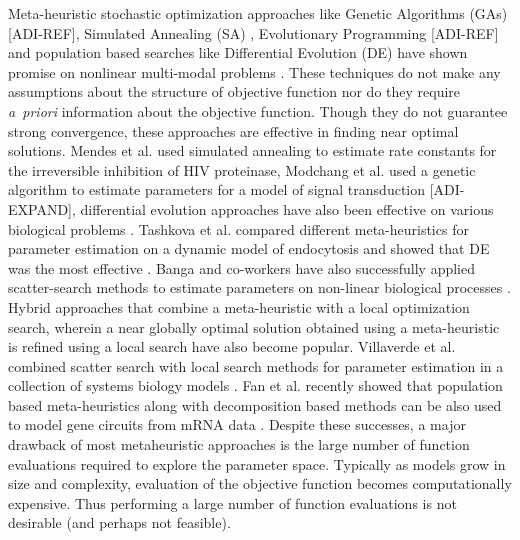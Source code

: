 \documentclass[12pt]{article}
\begin{document}
Meta-heuristic stochastic optimization approaches like Genetic Algorithms (GAs) [ADI-REF], Simulated Annealing (SA) \cite{kirkpatrick1983optimization},
Evolutionary Programming [ADI-REF] and population based searches like Differential Evolution (DE) \cite{storn1997differential} have shown promise on nonlinear multi-modal problems \cite{sun2012parameter}.
These techniques do not make any assumptions about the structure of objective function nor do they require \textit{a~priori} information about the objective function.
Though they do not guarantee strong convergence, these approaches are effective in finding near optimal solutions.
Mendes et al. \cite{mendes1998non} used simulated annealing to estimate rate constants for the irreversible inhibition of HIV proteinase,
Modchang et al. \cite{modchang2008mathematical} used a genetic algorithm to estimate parameters for a model of signal transduction [ADI-EXPAND],
differential evolution approaches have also been effective on various biological problems \cite{tsai2005evolutionary,wang2001hybrid,noman2007inferring}.
Tashkova et al. compared different meta-heuristics for parameter estimation on a dynamic model of endocytosis and showed that DE was the most effective \cite{tashkova2011parameter}.
Banga and co-workers have also successfully applied scatter-search methods to estimate parameters on non-linear biological processes \cite{villaverde2012cooperative,rodriguez2006novel,egea2007scatter}.
Hybrid approaches that combine a meta-heuristic with a local optimization search, wherein a near globally optimal solution obtained using a meta-heuristic is refined using a local search have also become popular.
Villaverde et al. combined scatter search with local search methods for parameter estimation in a collection of systems biology models \cite{villaverde2015biopredyn}.
Fan et al. recently showed that population based meta-heuristics along with decomposition based methods can be also used to model gene circuits from mRNA data \cite{fan2015parameter}.
Despite these successes, a major drawback of most metaheuristic approaches is the large number of function evaluations required to explore the parameter space.
Typically as models grow in size and complexity, evaluation of the objective function becomes computationally expensive.
Thus performing a large number of function evaluations is not desirable (and perhaps not feasible).

\end{document}
